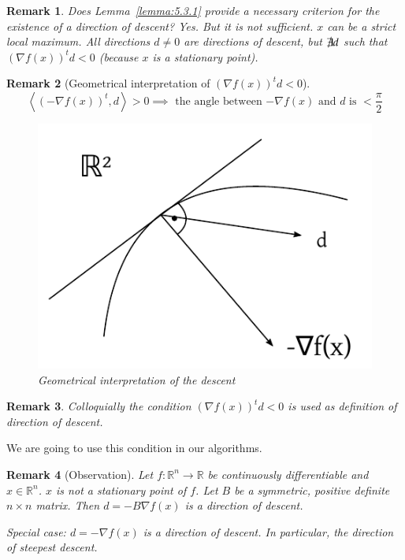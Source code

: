 \documentclass[a4paper]{article}
\numberwithin{lecref}{subsection}
\newtheorem*{Remark}{Remark}
\newcommand{\IP}[2]{\left\langle#1, #2\right\rangle}
\begin{document}
\begin{Remark}
	Does Lemma~\ref{lemma:5.3.1} provide a necessary criterion for the existence of a direction of descent? Yes.
	But it is not sufficient. $x$ can be a strict local maximum.
	All directions $d \neq 0$ are directions of descent, but $\not\exists d$ such that $\left(\nabla f(x)\right)^t d < 0$ (because $x$ is a stationary point).
\end{Remark}
\begin{Remark}[Geometrical interpretation of $\left(\nabla f(x)\right)^t d < 0$]
	\[ \IP{\left(- \nabla f(x)\right)^t}{d} > 0 \implies \text{ the angle between $-\nabla f(x)$ and $d$ is } < \frac\pi2 \]
	\begin{figure}[t]
		\begin{center}
			\includegraphics{img/25_descent.pdf}
			\caption{Geometrical interpretation of the descent}
		\end{center}
	\end{figure}
\end{Remark}
\begin{Remark}
	Colloquially the condition $(\nabla f(x))^t d < 0$ is used as definition of direction of descent.
\end{Remark}

We are going to use this condition in our algorithms.

\begin{Remark}[Observation]
	Let $f: \mathbb R^n \to \mathbb R$ be continuously differentiable and $x \in \mathbb R^n$. $x$ is not a stationary point of $f$.
	Let $B$ be a symmetric, positive definite $n\times n$ matrix. Then $d = -B \nabla f(x)$ is a direction of descent.

	\emph{Special case:} $d = -\nabla f(x)$ is a direction of descent. In particular, the direction of \emph{steepest descent}.
\end{Remark}
\end{document}
